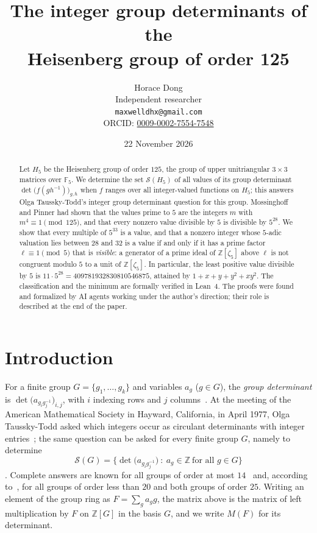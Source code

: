 \documentclass[11pt]{article}
\title{The integer group determinants of the\\ Heisenberg group of order 125}
\author{Horace Dong\\ \small Independent researcher\\
\small\texttt{maxwelldhx@gmail.com}\\
\small ORCID: \href{https://orcid.org/0009-0002-7554-7548}{0009-0002-7554-7548}}
\date{22 November 2026}
\theoremstyle{definition}
\theoremstyle{remark}
\newcommand{\Z}{\mathbb Z}
\newcommand{\cS}{\mathcal S}
\begin{document}
\maketitle

\begin{abstract}
Let $H_5$ be the Heisenberg group of order $125$, the group of upper
unitriangular $3\times3$ matrices over $\mathbb F_5$. We determine the set
$\cS(H_5)$ of all values of its group determinant $\det\bigl(f(gh^{-1})\bigr)_{g,h}$
when $f$ ranges over all integer-valued functions on $H_5$; this answers
Olga Taussky-Todd's integer group determinant question for this group.
Mossinghoff and Pinner had shown that the values prime to $5$ are the
integers $m$ with $m^4\equiv1\pmod{125}$, and that every nonzero value
divisible by $5$ is divisible by $5^{28}$. We show that every multiple of
$5^{33}$ is a value, and that a nonzero integer whose $5$-adic valuation lies
between $28$ and $32$ is a value if and only if it has a prime factor
$\ell\equiv1\pmod5$ that is \emph{visible}: a generator of a prime ideal of
$\mathbb Z[\zeta_5]$ above $\ell$ is not congruent modulo $5$ to a unit of
$\mathbb Z[\zeta_5]$. In particular, the least positive value divisible by $5$
is $11\cdot5^{28}=409781932830810546875$, attained by $1+x+y+y^2+xy^2$. The
classification and the minimum are formally verified in Lean~4. The proofs
were found and formalized by AI agents working under the author's direction;
their role is described at the end of the paper.
\end{abstract}

\section{Introduction}\label{sec:intro}

For a finite group $G=\{g_1,\dots,g_k\}$ and variables $a_g$ ($g\in G$), the
\emph{group determinant} is $\det\bigl(a_{g_ig_j^{-1}}\bigr)_{i,j}$, with $i$
indexing rows and $j$ columns~\cite[(1)]{mp}. At the meeting of the American
Mathematical Society in Hayward, California, in April 1977, Olga Taussky-Todd
asked which integers occur as circulant determinants with integer
entries~\cite[Section~1]{ps}; the same question can be asked for every finite group
$G$, namely to determine
\[
\cS(G)=\bigl\{\det\bigl(a_{g_ig_j^{-1}}\bigr)\ :\ a_g\in\Z\ \text{for all } g\in G\bigr\}
\]
\cite[(2)]{mp}. Complete answers are known for all groups of order at most
$14$~\cite{ps} and, according to~\cite{pan25}, for all groups of order less
than $20$ and both groups of order $25$. Writing an element of the group ring
as $F=\sum_g a_g g$, the matrix above is the matrix of left multiplication by
$F$ on $\Z[G]$ in the basis $G$, and we write $M(F)$ for its determinant.
\end{document}
